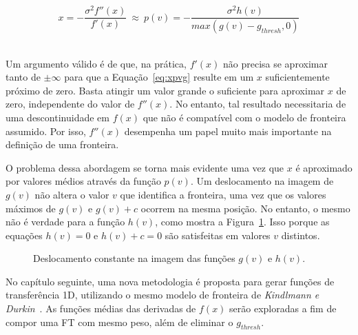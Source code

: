 \begin{equation} \label{eq:xpvg}
	x = -\frac{\sigma^{2}f''(x)}{f'(x)} \ \approx \ 
	p(v) = -\frac{\sigma^{2}h(v)}{max(g(v) - g_{thresh}, 0)}
\end{equation} \

	Um argumento válido é de que, na prática, $ f'(x) $ não precisa se aproximar tanto de $ \pm \infty $ para que a Equação~\eqref{eq:xpvg} resulte em um $ x $ suficientemente próximo de zero. Basta atingir um valor grande o suficiente para aproximar $ x $ de zero, independente do valor de $ f''(x) $. No entanto, tal resultado necessitaria de uma descontinuidade em $ f(x) $ que não é compatível com o modelo de fronteira assumido. Por isso, $ f''(x) $ desempenha um papel muito mais importante na definição de uma fronteira.
	
	O problema dessa abordagem se torna mais evidente uma vez que $ x $ é aproximado por valores médios através da função $ p(v) $. Um deslocamento na imagem de $ g(v) $ não altera o valor $ v $ que identifica a fronteira, uma vez que os valores máximos de $ g(v) $ e $ g(v) + c $ ocorrem na mesma posição. No entanto, o mesmo não é verdade para a função $ h(v) $, como mostra a Figura~\ref{fig:g_shift}. Isso porque as equações $ h(v) = 0 $ e $ h(v) + c = 0 $ são satisfeitas em valores $ v $ distintos.
	
\begin{figure}[h]
	\centering
	\caption{Deslocamento constante na imagem das funções $ g(v) $ e $ h(v) $.}
	\label{fig:g_shift}
\end{figure}

	No capítulo seguinte, uma nova metodologia é proposta para gerar funções de transferência 1D, utilizando o mesmo modelo de fronteira de \textit{Kindlmann e Durkin}~\cite{gordon}. As funções médias das derivadas de $ f(x) $ serão exploradas a fim de compor uma FT com mesmo peso, além de eliminar o $ g_{thresh} $.